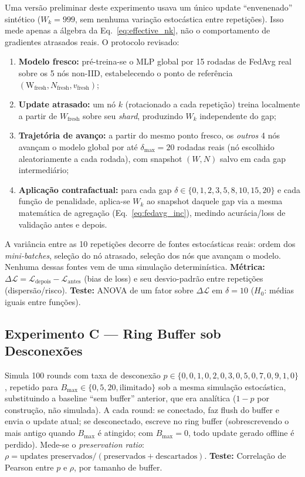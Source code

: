 \documentclass[conference,a4paper]{IEEEtran}
\begin{document}
Uma versão preliminar deste experimento usava um único update ``envenenado''
sintético ($W_k = 999$, sem nenhuma variação estocástica entre repetições).
Isso mede apenas a álgebra da Eq.~\ref{eq:effective_nk}, não o comportamento
de gradientes atrasados reais. O protocolo revisado:
\begin{enumerate}[noitemsep,leftmargin=*]
  \item \textbf{Modelo fresco:} pré-treina-se o MLP global por 15 rodadas de
    FedAvg real sobre os 5 nós non-IID, estabelecendo o ponto de referência $(\text{W}_{\text{fresh}},
    N_{\text{fresh}}, v_{\text{fresh}})$;
  \item \textbf{Update atrasado:} um nó $k$ (rotacionado a cada repetição)
    treina localmente a partir de $W_{\text{fresh}}$ sobre seu \textit{shard},
    produzindo $W_k$ independente do gap;
  \item \textbf{Trajetória de avanço:} a partir do mesmo ponto fresco, os
    \emph{outros} 4 nós avançam o modelo global por até $\delta_{\max}=20$
    rodadas reais (nó escolhido aleatoriamente a cada rodada), com snapshot
    $(W, N)$ salvo em cada gap intermediário;
  \item \textbf{Aplicação contrafactual:} para cada gap $\delta \in \{0,1,2,3,5,8,10,15,20\}$
    e cada função de penalidade, aplica-se $W_k$ ao snapshot daquele gap via
    a mesma matemática de agregação (Eq.~\ref{eq:fedavg_inc}), medindo
    acurácia/loss de validação antes e depois.
\end{enumerate}
A variância entre as 10 repetições decorre de fontes estocásticas reais:
ordem dos \textit{mini-batches}, seleção do nó atrasado, seleção dos nós que
avançam o modelo. Nenhuma dessas fontes vem de uma simulação determinística.
\textbf{Métrica:} $\Delta\mathcal{L} = \mathcal{L}_{\text{depois}} -
\mathcal{L}_{\text{antes}}$ (bias de loss) e seu desvio-padrão entre
repetições (dispersão/risco).
\textbf{Teste:} ANOVA de um fator sobre $\Delta\mathcal{L}$ em $\delta=10$
($H_0$: médias iguais entre funções).

\subsection{Experimento C --- Ring Buffer sob Desconexões}

Simula 100 rounds com taxa de desconexão
$p \in \{0, 0{,}1, 0{,}2, 0{,}3, 0{,}5, 0{,}7, 0{,}9, 1{,}0\}$, repetido para
$B_{\max} \in \{0, 5, 20, \text{ilimitado}\}$ sob a mesma simulação
estocástica, substituindo a baseline ``sem buffer'' anterior, que era
analítica ($1-p$ por construção, não simulada). A cada round: se conectado,
faz flush do buffer e envia o update atual; se desconectado, escreve no ring
buffer (sobrescrevendo o mais antigo quando $B_{\max}$ é atingido; com
$B_{\max}=0$, todo update gerado offline é perdido). Mede-se o
\textit{preservation ratio}:
$\rho = \text{updates preservados} / (\text{preservados} + \text{descartados})$.
\textbf{Teste:} Correlação de Pearson entre $p$ e $\rho$, por tamanho de
buffer.
\end{document}
